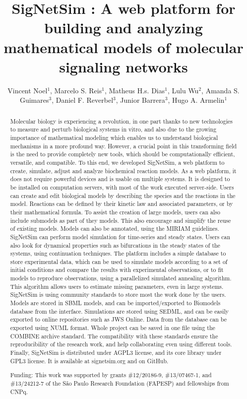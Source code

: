 \documentclass[twoside]{article}
\title{\vspace{-15mm}\fontsize{24pt}{10pt}\selectfont\textbf{SigNetSim : A web platform for building and analyzing mathematical models of molecular signaling networks}} %
\author{Vincent Noel$^1$, Marcelo S. Reis$^1$, Matheus H.s. Dias$^1$, Lulu Wu$^2$, Amanda S. Guimares$^3$, Daniel F. Reverbel$^3$, Junior Barrera$^3$, Hugo A. Armelin$^1$}
\affil{1 INSTITUTO BUTANTAN\\ 2 CENTER OF TOXINS, IMMUNE-RESPONSE AND CELL SIGNALING, INSTITUTO BUTANTAN\\ 3 INSTITUTO DE MATEM\'ATICA E ESTAT\'ISTICA, USP\\ }
\date{}
\begin{document}
\maketitle %

\thispagestyle{fancy} %


\begin{abstract}
Molecular biology is experiencing a revolution, in one part thanks to new technologies to measure and perturb biological systems in vitro, and also due to the growing importance of mathematical modeling which enables us to understand biological mechanisms in a more profound way. However, a crucial point in this transforming field is the need to provide completely new tools, which should be computationally efficient, versatile, and compatible. To this end, we developed SigNetSim, a web platform to create, simulate, adjust and analyze biochemical reaction models. As a web platform, it does not require powerful devices and is usable on multiple systems. It is designed to be installed on computation servers, with most of the work executed server-side. Users can create and edit biological models by describing the species and the reactions in the model. Reactions can be defined by their kinetic law and associated parameters, or by their mathematical formula. To assist the creation of large models, users can also include submodels as part of they models. This also encourage and simplify the reuse of existing models. Models can also be annotated, using the MIRIAM guidelines. SigNetSim can perform model simulation for time-series and steady states. Users can also look for dynamical properties such as bifurcations in the steady states of the systems, using continuation techniques. The platform includes a simple database to store experimental data, which can be used to simulate models according to a set of initial conditions and compare the results with experimental observations, or to fit models to reproduce observations, using a parallelized simulated annealing algorithm. This algorithm allows users to estimate missing parameters, even in large systems. SigNetSim is using community standards to store most the work done by the users. Models are stored in SBML models, and can be imported/exported to Biomodels database from the interface. Simulations are stored using SEDML, and can be easily exported to online repositories such as JWS Online. Data from the database can be exported using NUML format. Whole project can be saved in one file using the COMBINE archive standard. The compatibility with these standards ensure the reproducibility of the research work, and help collaborating even using different tools. Finally, SigNetSim is distributed under AGPL3 license, and its core library under GPL3 license. It is available at signetsim.org and on GitHub.

Funding: This work was supported by grants \#12/20186-9, \#13/07467-1, and \#13/24212-7 of the S\~ao Paulo Research Foundation (FAPESP) and fellowships from CNPq.
\end{abstract}
\end{document}
